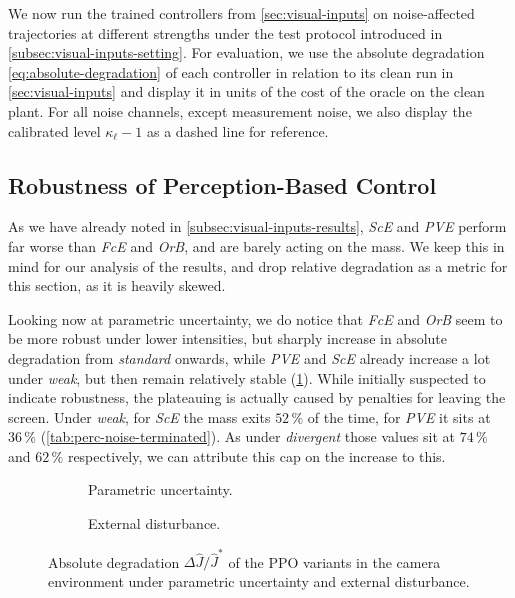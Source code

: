 We now run the trained controllers from \cref{sec:visual-inputs} on
noise-affected trajectories at different strengths under the test protocol introduced in \cref{subsec:visual-inputs-setting}.
For evaluation, we use the absolute degradation \eqref{eq:absolute-degradation} of each controller in relation to its clean run in \cref{sec:visual-inputs}
and display it in units of the cost of the oracle on the clean plant.
For all noise channels, except measurement noise, we also display the calibrated level $\kappa_{\ell} - 1$
as a dashed line for reference.

\subsection{Robustness of Perception-Based Control}
\label{subsec:perception-noise-results}

As we have already noted in \cref{subsec:visual-inputs-results}, \emph{ScE} and \emph{PVE} perform far worse than
\emph{FcE} and \emph{OrB}, and are barely acting on the mass. We keep this in mind for our analysis of the results,
and drop relative degradation as a metric for this section, as it is heavily skewed.

Looking now at parametric uncertainty, we do notice that \emph{FcE} and \emph{OrB} seem to be more robust under lower
intensities, but sharply increase in absolute degradation from \emph{standard} onwards, while \emph{PVE} and \emph{ScE}
already increase a lot under \emph{weak}, but then remain relatively stable (\cref{fig:perc-noise-parametric-absolute}).
While initially suspected to indicate robustness, the plateauing is actually caused by penalties for leaving the screen.
Under \emph{weak}, for \emph{ScE} the mass exits $52\,\%$ of the time, for \emph{PVE} it sits at $36\,\%$
(\cref{tab:perc-noise-terminated}). As under \emph{divergent} those values sit
at $74\,\%$ and $62\,\%$ respectively, we can attribute this cap on the increase to this.

\begin{figure}[htbp]
  \centering
  \begin{subfigure}[t]{0.49\linewidth}
    \centering
    \caption{Parametric uncertainty.}
    \label{fig:perc-noise-parametric-absolute}
  \end{subfigure}\hfill
  \begin{subfigure}[t]{0.49\linewidth}
    \centering
    \caption{External disturbance.}
    \label{fig:perc-noise-disturbance-absolute}
  \end{subfigure}
  \caption{Absolute degradation $\Delta \hat{J} / \hat{J}^{*}$ of the PPO variants in the camera environment under parametric uncertainty and external disturbance.}
  \label{fig:perc-noise-parametric-disturbance}
\end{figure}


